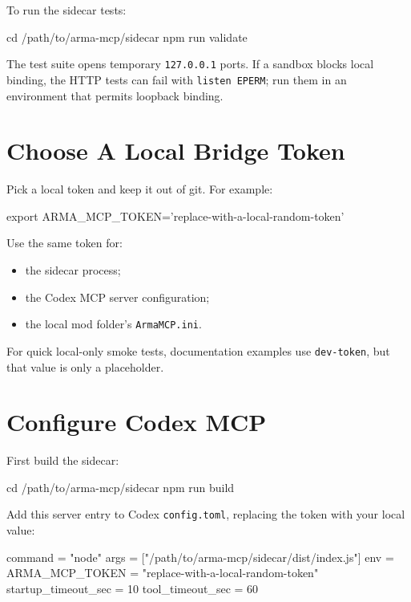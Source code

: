 \documentclass[11pt]{article}
\newcommand{\code}[1]{\texttt{#1}}
\begin{document}
To run the sidecar tests:

\begin{commandblock}
cd /path/to/arma-mcp/sidecar
npm run validate
\end{commandblock}

The test suite opens temporary \code{127.0.0.1} ports. If a sandbox blocks local
binding, the HTTP tests can fail with \code{listen EPERM}; run them in an
environment that permits loopback binding.

\section{Choose A Local Bridge Token}

Pick a local token and keep it out of git. For example:

\begin{commandblock}
export ARMA_MCP_TOKEN='replace-with-a-local-random-token'
\end{commandblock}

Use the same token for:

\begin{itemize}
  \item the sidecar process;
  \item the Codex MCP server configuration;
  \item the local mod folder's \code{ArmaMCP.ini}.
\end{itemize}

For quick local-only smoke tests, documentation examples use \code{dev-token}, but
that value is only a placeholder.

\section{Configure Codex MCP}

First build the sidecar:

\begin{commandblock}
cd /path/to/arma-mcp/sidecar
npm run build
\end{commandblock}

Add this server entry to Codex \code{config.toml}, replacing the token with your
local value:

\begin{commandblock}
command = "node"
args = ["/path/to/arma-mcp/sidecar/dist/index.js"]
env = { ARMA_MCP_TOKEN = "replace-with-a-local-random-token" }
startup_timeout_sec = 10
tool_timeout_sec = 60
\end{commandblock}
\end{document}
